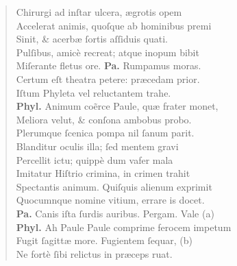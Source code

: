 \documentclass[a4paper,12pt]{article}
\begin{document}
\begin{verse}
Chirurgi ad inſtar ulcera, ægrotis opem\\[0pt]
Accelerat animis, quoſque ab hominibus premi\\[0pt]
Sinit, \& acerbæ ſortis aſſiduis quati.\\[0pt]
Pulſibus, amicè recreat; atque inopum bibit\\[0pt]
Miſerante fletus ore. \textbf{Pa.} Rumpamus moras.\\[0pt]
Certum eſt theatra petere: præcedam prior.\\[0pt]
Iſtum Phyleta vel reluctantem trahe.\\[0pt]
\textbf{Phyl.} Animum coẽrce Paule, quæ frater monet,\\[0pt]
Meliora velut, \& conſona ambobus probo.\\[0pt]
Plerumque ſcenica pompa nil ſanum parit.\\[0pt]
Blanditur oculis illa; ſed mentem gravi\\[0pt]
Percellit ictu; quippè dum vafer mala\\[0pt]
Imitatur Hiſtrio crimina, in crimen trahit\\[0pt]
Spectantis animum. Quiſquis alienum exprimit\\[0pt]
Quocumnque nomine vitium, errare is docet.\\[0pt]
\textbf{Pa.} Canis iſta ſurdis auribus. Pergam. Vale (a)\footnotemark\\[0pt]
\textbf{Phyl.} Ah Paule Paule comprime ferocem impetum\\[0pt]
Fugit ſagittæ more. Fugientem ſequar, (b)\footnotemark\\[0pt]
Ne fortè ſibi relictus in præceps ruat.\\[0pt]
\end{verse}
\end{document}
